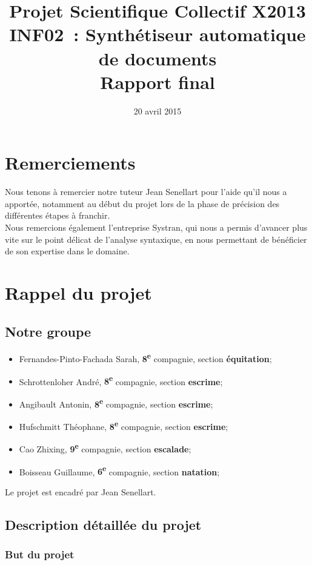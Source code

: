 \documentclass[a4paper, 12pt]{article}
\title{Projet Scientifique Collectif X2013 \\INF02~: Synthétiseur automatique de documents \\Rapport final}
\author{\membres} %
\date{20 avril 2015}
\begin{document}
\titrelong{}


\tableofcontents
\newpage

\section*{Remerciements}

Nous tenons à remercier notre tuteur Jean Senellart pour l'aide qu'il nous a apportée, notamment au début du projet lors de la phase de précision des différentes étapes à franchir.\\

Nous remercions également l'entreprise Systran, qui nous a permis d'avancer plus vite sur le point délicat de l'analyse syntaxique, en nous permettant de bénéficier de son expertise dans le domaine.

\section{Rappel du projet}

\subsection{Notre groupe}
\begin{itemize}
 \item Fernandes-Pinto-Fachada Sarah, \textbf{8\textsuperscript{e}} compagnie, section \textbf{équitation};
 \item Schrottenloher André, \textbf{8\textsuperscript{e}} compagnie, section \textbf{escrime};
 \item Angibault Antonin, \textbf{8\textsuperscript{e}} compagnie, section \textbf{escrime};
 \item Hufschmitt Théophane, \textbf{8\textsuperscript{e}} compagnie, section \textbf{escrime};
 \item Cao Zhixing, \textbf{9\textsuperscript{e}} compagnie, section \textbf{escalade};
 \item Boisseau Guillaume, \textbf{6\textsuperscript{e}} compagnie, section \textbf{natation};
\end{itemize}

Le projet est encadré par Jean Senellart.

\subsection{Description détaillée du projet}

\subsubsection{But du projet}
\end{document}
